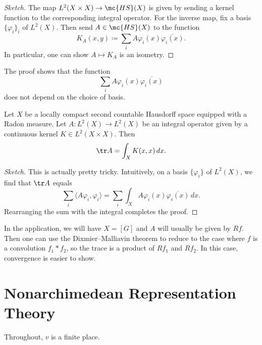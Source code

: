\documentclass{article}
\begin{document}
\begin{proof}[Sketch]
	The map $L^2(X\times X)\to\mc{HS}(X)$ is given by sending a kernel function to the corresponding integral operator. For the inverse map, fix a basis $\{\varphi_i\}_i$ of $L^2(X)$. Then send $A\in\mc{HS}(X)$ to the function
	\[K_A(x,y)\coloneqq\sum_iA\varphi_i(x)\overline{\varphi_i(x)}.\]
	In particular, one can show $A\mapsto K_A$ is an isometry.
\end{proof}
\begin{remark}
	The proof shows that the function
	\[\sum_iA\varphi_i(x)\overline{\varphi_i(x)}\]
	does not depend on the choice of basis.
\end{remark}
\begin{proposition}
	Let $X$ be a locally compact second countable Hausdorff space equipped with a Radon measure. Let $A\colon L^2(X)\to L^2(X)$ be an integral operator given by a continuous kernel $K\in L^2(X\times X)$. Then
	\[\tr A=\int_XK(x,x)\,dx.\]
\end{proposition}
\begin{proof}[Sketch]
	This is actually pretty tricky. Intuitively, on a basis $\{\varphi_i\}$ of $L^2(X)$, we find that $\tr A$ equals
	\[\sum_i\langle A\varphi_i,\varphi_i\rangle=\sum_i\int_XA\varphi_i(x)\overline{\varphi_i(x)}\,dx.\]
	Rearranging the sum with the integral completes the proof.
\end{proof}
\begin{remark}
	In the application, we will have $X=[G]$ and $A$ will usually be given by $Rf$. Then one can use the Dixmier--Malliavin theorem to reduce to the case where $f$ is a convolution $f_1*f_2$, so the trace is a product of $Rf_1$ and $Rf_2$. In this case, convergence is easier to show.
\end{remark}

\section{Nonarchimedean Representation Theory}
Throughout, $v$ is a finite place.
\end{document}
